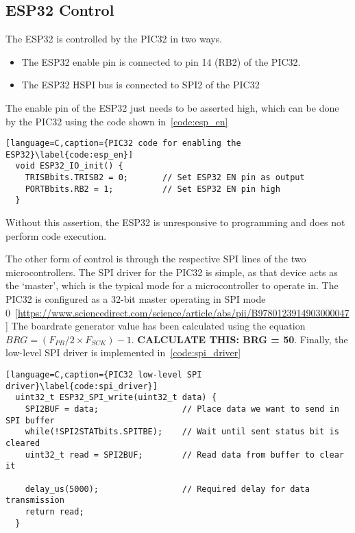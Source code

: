 \subsection{ESP32 Control}
The ESP32 is controlled by the PIC32 in two ways.

\begin{itemize}
        \item The ESP32 enable pin is connected to pin 14 (RB2) of the PIC32.
        \item The ESP32 HSPI bus is connected to SPI2 of the PIC32
\end{itemize}

The enable pin of the ESP32 just needs to be asserted high, which can be done by the PIC32 using the code shown in~\autoref{code:esp_en}

\begin{lstlisting}[language=C,caption={PIC32 code for enabling the ESP32}\label{code:esp_en}]
  void ESP32_IO_init() {
    TRISBbits.TRISB2 = 0;       // Set ESP32 EN pin as output
    PORTBbits.RB2 = 1;          // Set ESP32 EN pin high
  }
\end{lstlisting}

Without this assertion, the ESP32 is unresponsive to programming and does not perform code execution.

The other form of control is through the respective SPI lines of the two microcontrollers.
The SPI driver for the PIC32 is simple, as that device acts as the `master', which is the typical mode for a microcontroller to operate in.
The PIC32 is configured as a 32-bit master operating in SPI mode 0~\ref{https://www.sciencedirect.com/science/article/abs/pii/B9780123914903000047}
The boardrate generator value has been calculated using the equation \(BRG = (F_{PB} / 2 \times F_{SCK}) - 1\). \textbf{CALCULATE THIS: BRG = 50}.
Finally, the low-level SPI driver is implemented in~\autoref{code:spi_driver}

\begin{lstlisting}[language=C,caption={PIC32 low-level SPI driver}\label{code:spi_driver}]
  uint32_t ESP32_SPI_write(uint32_t data) {
    SPI2BUF = data;                 // Place data we want to send in SPI buffer
    while(!SPI2STATbits.SPITBE);    // Wait until sent status bit is cleared
    uint32_t read = SPI2BUF;        // Read data from buffer to clear it

    delay_us(5000);                 // Required delay for data transmission
    return read;
  }
\end{lstlisting}

